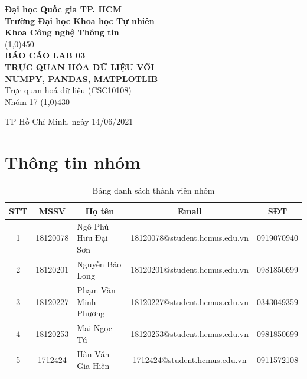 \documentclass[a4paper, 12pt]{article}
\begin{document}
\begin{titlepage}
    \begin{center}
        \vspace*{1cm}
        \Large\textbf{Đại học Quốc gia TP. HCM\\Trường Đại học Khoa học Tự nhiên\\Khoa Công nghệ Thông tin}\\

        \vfill
        \line(1,0){450}\\[4mm]
        \LARGE\textbf{\MakeUppercase{Báo cáo Lab 03\\Trực quan hóa dữ liệu với\\Numpy, Pandas, Matplotlib}}\\[3mm]
        \Large{Trực quan hoá dữ liệu (CSC10108)}\\[3mm]
        \Large{Nhóm 17}
        \line(1,0){430}\\
        \vfill

        \vfill
        TP Hồ Chí Minh, ngày 14/06/2021
    \end{center}
\end{titlepage}

\tableofcontents
\thispagestyle{empty}
\clearpage

\section{Thông tin nhóm}
    \begin{table}[H]
        \begin{tabular}{|c|c|l|c|c|}
        \hline
        STT & MSSV     & \multicolumn{1}{c|}{Họ tên} & Email                         & SĐT        \\ \hline
        1   & 18120078 & Ngô Phù Hữu Đại Sơn         & 18120078@student.hcmus.edu.vn & 0919070940 \\ \hline
        2   & 18120201 & Nguyễn Bảo Long             & 18120201@student.hcmus.edu.vn & 0981850699 \\ \hline
        3   & 18120227 & Phạm Văn Minh Phương             & 18120227@student.hcmus.edu.vn & 0343049359 \\ \hline
        4   & 18120253 & Mai Ngọc Tú             & 18120253@student.hcmus.edu.vn & 0981850699 \\ \hline
        5   & 1712424 & Hàn Văn Gia Hiên            & 1712424@student.hcmus.edu.vn & 0911572108 \\ \hline
        \end{tabular}
        \caption{Bảng danh sách thành viên nhóm}
    \end{table}
\end{document}
